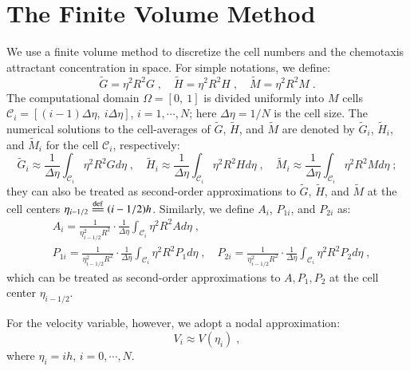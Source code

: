 \documentclass{amsart}
\theoremstyle{definition}
\theoremstyle{remark}
\numberwithin{equation}{section}
\numberwithin{figure}{section}
\newcommand{\eqdef}{\stackrel{\mathrm{def}}{=\joinrel=}}
\begin{document}
\section{The Finite Volume Method}
\label{sec:fvm}
We use a finite volume method to discretize the cell numbers and the chemotaxis attractant concentration in space.
For simple notations, we define:
\begin{equation}
\tilde{G} = \eta^2R^2G\;,\quad
\tilde{H} = \eta^2R^2H\;,\quad
\tilde{M} = \eta^2R^2M\;.
\end{equation}
The computational domain $\Omega=[0,\ 1]$ is divided uniformly into $M$ cells $\mathcal{C}_i=[(i-1)\Delta\eta,\ i\Delta\eta]$, $i=1,\cdots,N$; here $\Delta\eta=1/N$ is the cell size.
The numerical solutions to the cell-averages of $\tilde{G}$, $\tilde{H}$, and $\tilde{M}$ are denoted by $\tilde{G}_i$, $\tilde{H}_i$, and $\tilde{M}_i$ for the cell $\mathcal{C}_i$, respectively:
\begin{displaymath}
\tilde{G}_i \approx \frac{1}{\Delta\eta}\int_{\mathcal{C}_i}\eta^2R^2Gd\eta\;,\quad
\tilde{H}_i \approx \frac{1}{\Delta\eta}\int_{\mathcal{C}_i}\eta^2R^2Hd\eta\;,\quad
\tilde{M}_i \approx \frac{1}{\Delta\eta}\int_{\mathcal{C}_i}\eta^2R^2Md\eta\;;
\end{displaymath}
they can also be treated as second-order approximations to $\tilde{G}$, $\tilde{H}$, and $\tilde{M}$ at the cell centers $\eta_{i-1/2}\eqdef(i-1/2)h$.
Similarly, we define $A_i$, $P_{1i}$, and $P_{2i}$ as:
\begin{align*}
  &A_i = \frac{1}{\eta_{i-1/2}^2R^2}\cdot\frac{1}{\Delta\eta}\int_{\mathcal{C}_i}\eta^2R^2Ad\eta\;,\\
  &P_{1i} = \frac{1}{\eta_{i-1/2}^2R^2}\cdot\frac{1}{\Delta\eta}\int_{\mathcal{C}_i}\eta^2R^2P_1d\eta\;,\quad
  P_{2i} = \frac{1}{\eta_{i-1/2}^2R^2}\cdot\frac{1}{\Delta\eta}\int_{\mathcal{C}_i}\eta^2R^2P_2d\eta\;,
\end{align*}
which can be treated as second-order approximations to $A, P_1, P_2$ at the cell center $\eta_{i-1/2}$.

For the velocity variable, however, we adopt a nodal approximation:
\begin{displaymath}
V_i \approx V(\eta_i)\;,
\end{displaymath}
where $\eta_i=ih$, $i=0,\cdots,N$.
\end{document}

